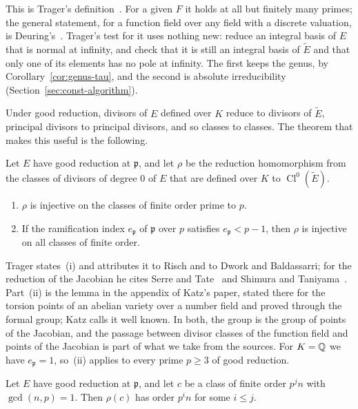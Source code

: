This is Trager's definition~\cite[\S6.2]{trager1984}. For a given $F$ it
holds at all but finitely many primes; the general statement, for a function
field over any field with a discrete valuation, is
Deuring's~\cite{deuring1941}. Trager's test for it uses nothing new: reduce
an integral basis of $E$ that is normal at infinity, and check that it is
still an integral basis of $\tilde E$ and that only one of its elements has
no pole at infinity. The first keeps the genus, by
Corollary~\ref{cor:genus-tau}, and the second is absolute irreducibility
(Section~\ref{sec:const-algorithm}).

Under good reduction, divisors of $E$ defined over $K$ reduce to divisors of
$\tilde E$, principal divisors to principal divisors, and so classes to
classes. The theorem that makes this useful is the following.

\begin{theorem}\label{thm:reduction-torsion}
Let $E$ have good reduction at $\mathfrak p$, and let $\rho$ be the reduction
homomorphism from the classes of divisors of degree $0$ of $E$ that are
defined over $K$ to $\operatorname{Cl}^0(\tilde E)$.
\begin{enumerate}[label=\textup{(\roman*)}]
\item $\rho$ is injective on the classes of finite order prime to $p$.
\item If the ramification index $e_{\mathfrak p}$ of $\mathfrak p$ over $p$
  satisfies $e_{\mathfrak p} < p - 1$, then $\rho$ is injective on all classes
  of finite order.
\end{enumerate}
\end{theorem}

Trager states~(i) and attributes it to Risch and to Dwork and Baldassarri;
for the reduction of the Jacobian he cites Serre and
Tate~\cite{serretate1968} and Shimura and Taniyama~\cite{shimura1961}. Part~(ii)
is the lemma in the appendix of Katz's paper, stated there for the torsion
points of an abelian variety over a number field and proved through the
formal group; Katz calls it well known. In both, the group is the group of
points of the Jacobian, and the passage between divisor classes of the
function field and points of the Jacobian is part of what we take from the
sources. For $K = \mathbb{Q}$ we have $e_{\mathfrak p} = 1$, so~(ii) applies to every
prime $p \ge 3$ of good reduction.

\begin{corollary}\label{cor:order-reduction}
Let $E$ have good reduction at $\mathfrak p$, and let $c$ be a class of
finite order $p^j n$ with $\gcd(n, p) = 1$. Then $\rho(c)$ has order $p^i n$
for some $i \le j$.
\end{corollary}

